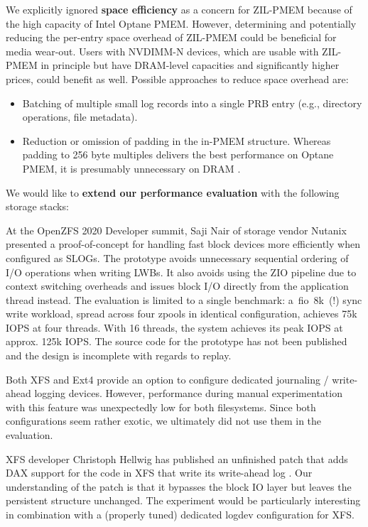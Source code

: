 \documentclass[12pt,a4paper,twoside]{book}
\begin{document}
We explicitly ignored \textbf{space efficiency} as a concern for ZIL-PMEM because of the high capacity of Intel Optane PMEM.
However, determining and potentially reducing the per-entry space overhead of ZIL-PMEM could be beneficial for media wear-out.
Users with NVDIMM-N devices, which are usable with ZIL-PMEM in principle but have DRAM-level capacities and significantly higher prices, could benefit as well.
Possible approaches to reduce space overhead are:
\begin{itemize}[noitemsep]
    \item Batching of multiple small log records into a single PRB entry (e.g., directory operations, file metadata).
    \item Reduction or omission of padding in the in-PMEM structure.
        Whereas padding to 256 byte multiples delivers the best performance on Optane PMEM, it is presumably unnecessary on DRAM \cite{yangEmpiricalGuideBehavior2020}.
\end{itemize}

We would like to \textbf{extend our performance evaluation} with the following storage stacks:
\begin{description}[noitemsep,leftmargin=1.5cm,labelindent=1cm]
    \item[ZIL ZIO Bypass By Saji Nair]
    At the OpenZFS 2020 Developer summit, Saji Nair of storage vendor Nutanix presented a proof-of-concept for handling fast block devices more efficiently when configured as SLOGs.
    The prototype avoids unnecessary sequential ordering of I/O operations when writing LWBs.
    It also avoids using the ZIO pipeline due to context switching overheads and issues block I/O directly from the application thread instead.
    The evaluation is limited to a single benchmark: a~fio~8k~(!) sync write workload, spread across four zpools in identical configuration, achieves 75k IOPS at four threads.
    With 16 threads, the system achieves its peak IOPS at approx. 125k IOPS.
    The source code for the prototype has not been published and the design is incomplete with regards to replay.~\cite{openzfsZILPerformanceImprovements2020}

    \item[Ext4 journal\_dev / XFS logdev] Both XFS and Ext4 provide an option to configure dedicated journaling / write-ahead logging devices.
        However, performance during manual experimentation with this feature was unexpectedly low for both filesystems.
        Since both configurations seem rather exotic, we ultimately did not use them in the evaluation.

    \item[XFS DAX Log Patch] XFS developer Christoph Hellwig has published an unfinished patch that adds DAX support for the code in XFS that write its write-ahead log \cite{LKMLChristophHellwig}.
        Our understanding of the patch is that it bypasses the block IO layer but leaves the persistent structure unchanged.
        The experiment would be particularly interesting in combination with a (properly tuned) dedicated logdev configuration for XFS.
\end{description}
\end{document}
